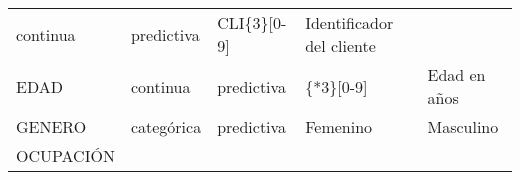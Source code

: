 \documentclass[]{book}
\begin{document}
\begin{longtable}[]{@{}lllll@{}}
\begin{minipage}[t]{0.06\columnwidth}
continua\strut
\end{minipage} & \begin{minipage}[t]{0.06\columnwidth}\raggedright\strut
predictiva\strut
\end{minipage} & \begin{minipage}[t]{0.42\columnwidth}\raggedright\strut
CLI\{3\}{[}0-9{]}\strut
\end{minipage} & \begin{minipage}[t]{0.27\columnwidth}\raggedright\strut
Identificador del cliente\strut
\end{minipage}\tabularnewline
\begin{minipage}[t]{0.06\columnwidth}\raggedright\strut
EDAD\strut
\end{minipage} & \begin{minipage}[t]{0.06\columnwidth}\raggedright\strut
continua\strut
\end{minipage} & \begin{minipage}[t]{0.06\columnwidth}\raggedright\strut
predictiva\strut
\end{minipage} & \begin{minipage}[t]{0.42\columnwidth}\raggedright\strut
\{*3\}{[}0-9{]}\strut
\end{minipage} & \begin{minipage}[t]{0.27\columnwidth}\raggedright\strut
Edad en años\strut
\end{minipage}\tabularnewline
\begin{minipage}[t]{0.06\columnwidth}\raggedright\strut
GENERO\strut
\end{minipage} & \begin{minipage}[t]{0.06\columnwidth}\raggedright\strut
categórica\strut
\end{minipage} & \begin{minipage}[t]{0.06\columnwidth}\raggedright\strut
predictiva\strut
\end{minipage} & \begin{minipage}[t]{0.42\columnwidth}\raggedright\strut
Femenino\strut
\end{minipage} & \begin{minipage}[t]{0.27\columnwidth}\raggedright\strut
Masculino\strut
\end{minipage}\tabularnewline
\begin{minipage}[t]{0.06\columnwidth}\raggedright\strut
OCUPACIÓN\strut
\end{minipage} & \begin{minipage}[t]{0.06\columnwidth}\raggedright\strut

\end{minipage}
\end{longtable}
\end{document}
